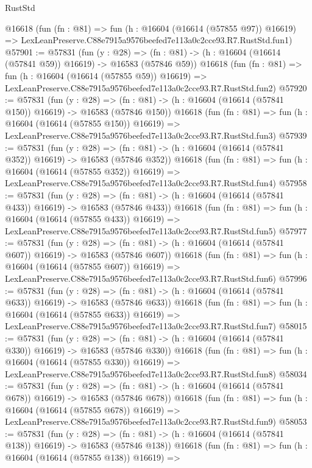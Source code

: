 \begin{lexlean}{RustStd}
\begin{coremodule}
    @16618
    (fun (fn : @81) =>
    fun (h : @16604 (@16614 (@57855 @97)) @16619) =>
    LexLeanPreserve.C88e7915a9576beefed7e113a0c2cce93.R7.RustStd.fun1)
@57901 := @57831
    (fun (y : @28) =>
    (fn : @81) -> (h : @16604 (@16614 (@57841 @59)) @16619) -> @16583 (@57846 @59))
    @16618
    (fun (fn : @81) =>
    fun (h : @16604 (@16614 (@57855 @59)) @16619) =>
    LexLeanPreserve.C88e7915a9576beefed7e113a0c2cce93.R7.RustStd.fun2)
@57920 := @57831
    (fun (y : @28) =>
    (fn : @81) -> (h : @16604 (@16614 (@57841 @150)) @16619) -> @16583 (@57846 @150))
    @16618
    (fun (fn : @81) =>
    fun (h : @16604 (@16614 (@57855 @150)) @16619) =>
    LexLeanPreserve.C88e7915a9576beefed7e113a0c2cce93.R7.RustStd.fun3)
@57939 := @57831
    (fun (y : @28) =>
    (fn : @81) -> (h : @16604 (@16614 (@57841 @352)) @16619) -> @16583 (@57846 @352))
    @16618
    (fun (fn : @81) =>
    fun (h : @16604 (@16614 (@57855 @352)) @16619) =>
    LexLeanPreserve.C88e7915a9576beefed7e113a0c2cce93.R7.RustStd.fun4)
@57958 := @57831
    (fun (y : @28) =>
    (fn : @81) -> (h : @16604 (@16614 (@57841 @433)) @16619) -> @16583 (@57846 @433))
    @16618
    (fun (fn : @81) =>
    fun (h : @16604 (@16614 (@57855 @433)) @16619) =>
    LexLeanPreserve.C88e7915a9576beefed7e113a0c2cce93.R7.RustStd.fun5)
@57977 := @57831
    (fun (y : @28) =>
    (fn : @81) -> (h : @16604 (@16614 (@57841 @607)) @16619) -> @16583 (@57846 @607))
    @16618
    (fun (fn : @81) =>
    fun (h : @16604 (@16614 (@57855 @607)) @16619) =>
    LexLeanPreserve.C88e7915a9576beefed7e113a0c2cce93.R7.RustStd.fun6)
@57996 := @57831
    (fun (y : @28) =>
    (fn : @81) -> (h : @16604 (@16614 (@57841 @633)) @16619) -> @16583 (@57846 @633))
    @16618
    (fun (fn : @81) =>
    fun (h : @16604 (@16614 (@57855 @633)) @16619) =>
    LexLeanPreserve.C88e7915a9576beefed7e113a0c2cce93.R7.RustStd.fun7)
@58015 := @57831
    (fun (y : @28) =>
    (fn : @81) -> (h : @16604 (@16614 (@57841 @330)) @16619) -> @16583 (@57846 @330))
    @16618
    (fun (fn : @81) =>
    fun (h : @16604 (@16614 (@57855 @330)) @16619) =>
    LexLeanPreserve.C88e7915a9576beefed7e113a0c2cce93.R7.RustStd.fun8)
@58034 := @57831
    (fun (y : @28) =>
    (fn : @81) -> (h : @16604 (@16614 (@57841 @678)) @16619) -> @16583 (@57846 @678))
    @16618
    (fun (fn : @81) =>
    fun (h : @16604 (@16614 (@57855 @678)) @16619) =>
    LexLeanPreserve.C88e7915a9576beefed7e113a0c2cce93.R7.RustStd.fun9)
@58053 := @57831
    (fun (y : @28) =>
    (fn : @81) -> (h : @16604 (@16614 (@57841 @138)) @16619) -> @16583 (@57846 @138))
    @16618
    (fun (fn : @81) =>
    fun (h : @16604 (@16614 (@57855 @138)) @16619) =>

\end{coremodule}
\end{lexlean}
